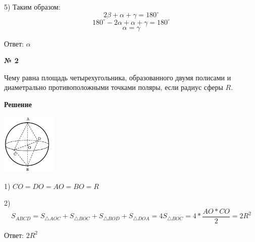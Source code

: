     5) Таким образом:
    \[
        2\beta + \alpha + \gamma = 180^{\circ}
    \]
    \[
        180^{\circ} - 2\alpha + \alpha + \gamma = 180 ^{\circ}
    \]
    \[ \alpha = \gamma \]

    Ответ: $\alpha$

    \begin{center}
        \textbf{№ 2}
    \end{center}

    Чему равна площадь четырехугольника, образованного двумя полисами и диаметрально противоположными точками поляры,
    если радиус сферы $R$.

    \textbf{Решение}\\

    \begin{center}
        \includegraphics[width=0.2\textwidth]{images/img3}\\
    \end{center}

    1) $CO = DO = AO = BO = R$

    2)
    \[
        S_{ABCD} = S_{\triangle AOC} + S_{\triangle BOC} + S_{\triangle BOD} + S_{\triangle DOA} = 4 S_{\triangle BOC} = 4 * \frac{AO * CO}{2} = 2R^2
    \]

    Ответ: $2R^2$







